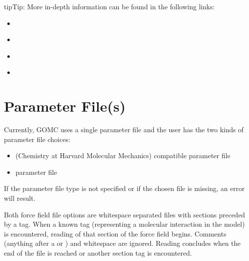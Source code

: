 \documentclass[letterpaper,10pt,english]{sphinxmanual}
\begin{document}
\begin{sphinxadmonition}{tip}{Tip:}
More in-depth information can be found in the following links:
\begin{itemize}
\item {} 

\end{itemize}
\begin{itemize}
\item {} 

\end{itemize}
\begin{itemize}
\item {} 

\end{itemize}
\begin{itemize}
\item {} 

\end{itemize}
\end{sphinxadmonition}


\section{Parameter File(s)}
\label{\detokenize{input_file:parameter-file-s}}
Currently, GOMC uses a single parameter file and the user has the two kinds of parameter file choices:
\begin{itemize}
\item {} 
 (Chemistry at Harvard Molecular Mechanics) compatible parameter file

\item {} 
 parameter file

\end{itemize}

If the parameter file type is not specified or if the chosen file is missing, an error will result.

Both force field file options are whitespace separated files with sections preceded by a tag. When a known tag (representing a molecular interaction in the model) is encountered, reading of that section of the force field begins. Comments (anything after a \sphinxcode{\sphinxupquote{*}} or \sphinxcode{\sphinxupquote{!}}) and whitespace are ignored. Reading concludes when the end of the file is reached or another section tag is encountered.
\end{document}
